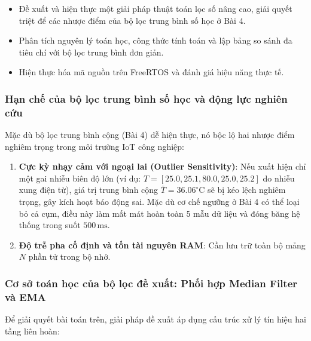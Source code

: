 \begin{tcolorbox}[
    enhanced, colback=black!2, colframe=black!60, boxrule=1pt, arc=2.5mm, drop shadow,
    attach boxed title to top left={xshift=4mm, yshift=-3mm},
    boxed title style={enhanced, colback=black!85, colframe=black!85, boxrule=1pt, arc=2.5mm, drop shadow, left=6pt, right=6pt, top=2pt, bottom=2pt},
    title=\textcolor{white}{\large\textbf{Yêu cầu đề bài (Trích phiếu bài tập)}}
]
\bfseries
\vspace{0.2cm}
\begin{itemize}
    \item Đề xuất và hiện thực một giải pháp thuật toán lọc số nâng cao, giải quyết triệt để các nhược điểm của bộ lọc trung bình số học ở Bài 4.
    \item Phân tích nguyên lý toán học, công thức tính toán và lập bảng so sánh đa tiêu chí với bộ lọc trung bình đơn giản.
    \item Hiện thực hóa mã nguồn trên FreeRTOS và đánh giá hiệu năng thực tế.
\end{itemize}
\end{tcolorbox}

\vspace{0.2cm}
\subsubsection{Hạn chế của bộ lọc trung bình số học và động lực nghiên cứu}
Mặc dù bộ lọc trung bình cộng (Bài 4) dễ hiện thực, nó bộc lộ hai nhược điểm nghiêm trọng trong môi trường IoT công nghiệp:
\begin{enumerate}[leftmargin=*]
    \item \textbf{Cực kỳ nhạy cảm với ngoại lai (Outlier Sensitivity)}: Nếu xuất hiện chỉ một gai nhiễu biên độ lớn (ví dụ: $T = [25.0, 25.1, 80.0, 25.0, 25.2]$ do nhiễu xung điện từ), giá trị trung bình cộng $\bar{T} = 36.06^\circ\text{C}$ sẽ bị kéo lệch nghiêm trọng, gây kích hoạt báo động sai. Mặc dù cơ chế ngưỡng ở Bài 4 có thể loại bỏ cả cụm, điều này làm mất mát hoàn toàn 5 mẫu dữ liệu và đóng băng hệ thống trong suốt $500\,\text{ms}$.
    \item \textbf{Độ trễ pha cố định và tốn tài nguyên RAM}: Cần lưu trữ toàn bộ mảng $N$ phần tử trong bộ nhớ.
\end{enumerate}

\subsubsection{Cơ sở toán học của bộ lọc đề xuất: Phối hợp Median Filter và EMA}
Để giải quyết bài toán trên, giải pháp đề xuất áp dụng cấu trúc xử lý tín hiệu hai tầng liên hoàn:

